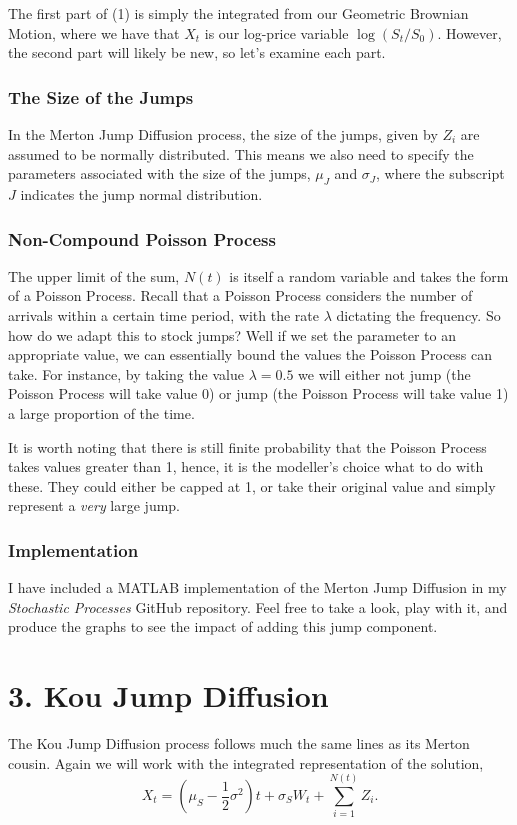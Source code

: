 \documentclass[11pt]{article}
\begin{document}
The first part of (1) is simply the integrated from our Geometric Brownian Motion, where we have that $X_t$ is our log-price variable $\log(S_t/S_0)$. However, the second part will likely be new, so let's examine each part.

\subsubsection*{The Size of the Jumps}
In the Merton Jump Diffusion process, the size of the jumps, given by $Z_i$ are assumed to be normally distributed. This means we also need to specify the parameters associated with the size of the jumps, $\mu_J$ and $\sigma_J$, where the subscript $J$ indicates the jump normal distribution.

\subsubsection*{Non-Compound Poisson Process}
The upper limit of the sum, $N(t)$ is itself a random variable and takes the form of a Poisson Process. Recall that a Poisson Process considers the number of arrivals within a certain time period, with the rate $\lambda$ dictating the frequency. So how do we adapt this to stock jumps? Well if we set the parameter to an appropriate value, we can essentially bound the values the Poisson Process can take. For instance, by taking the value $\lambda = 0.5$ we will either not jump (the Poisson Process will take value 0) or jump (the Poisson Process will take value 1) a large proportion of the time.

It is worth noting that there is still finite probability that the Poisson Process takes values greater than 1, hence, it is the modeller's choice what to do with these. They could either be capped at 1, or take their original value and simply represent a \textit{very} large jump.

\subsubsection*{Implementation}
I have included a MATLAB implementation of the Merton Jump Diffusion in my \textit{Stochastic Processes} GitHub repository. Feel free to take a look, play with it, and produce the graphs to see the impact of adding this jump component. 

\section*{3. Kou Jump Diffusion}
The Kou Jump Diffusion process follows much the same lines as its Merton cousin. Again we will work with the integrated representation of the solution,
\begin{equation}
    X_t = (\mu_S - \frac{1}{2} \sigma^2)t + \sigma_S W_t + \sum_{i=1}^{N(t)} Z_i.
\end{equation}
\end{document}
